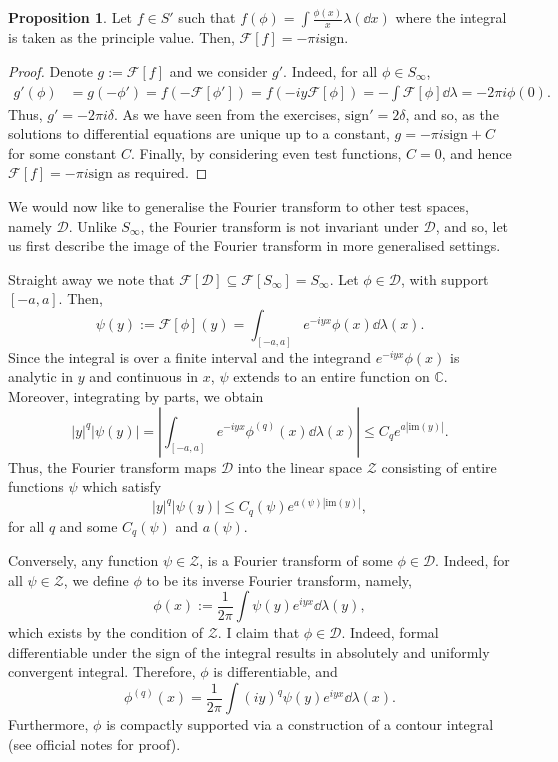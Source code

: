 \documentclass[]{article}
\theoremstyle{definition}
\theoremstyle{definition}
\newtheorem{proposition}{Proposition}[section]
\begin{document}
\begin{proposition}
  Let \(f \in S'\) such that \(f(\phi) = \int \frac{\phi(x)}{x} \lambda(\dd x)\) 
  where the integral is taken as the principle value. Then, 
  \(\mathcal{F}[f] = -\pi i\text{sign}\).
\end{proposition}
\begin{proof}
  Denote \(g := \mathcal{F}[f]\) and we consider \(g'\). Indeed, for all 
  \(\phi \in S_\infty\),
  \[\begin{split}
    g'(\phi) & = g(-\phi') = f(-\mathcal{F}[\phi']) = 
      f(-iy \mathcal{F}[\phi]) = -\int \mathcal{F}[\phi] \dd \lambda = 
      -2\pi i \phi(0). 
  \end{split}\]
  Thus, \(g' = - 2\pi i \delta\). As we have seen from the exercises, 
  \(\text{sign}' = 2\delta\), and so, as the solutions to differential equations 
  are unique up to a constant, \(g = -\pi i \text{sign} + C\) for some 
  constant \(C\). Finally, by considering even test functions, \(C = 0\), and 
  hence \(\mathcal{F}[f] = -\pi i\text{sign}\) as required.
\end{proof}

We would now like to generalise the Fourier transform to other test spaces, 
namely \(\mathcal{D}\). Unlike \(S_\infty\), the Fourier transform is not 
invariant under \(\mathcal{D}\), and so, let us first describe the image 
of the Fourier transform in more generalised settings.

Straight away we note that \(\mathcal{F}[\mathcal{D}] \subseteq 
\mathcal{F}[S_\infty] = S_\infty\). Let \(\phi \in \mathcal{D}\), 
with support \([-a, a]\). Then, 
\[\psi(y) := \mathcal{F}[\phi](y) = \int_{[-a, a]} e^{-iyx} \phi(x) \dd \lambda(x).\]
Since the integral is over a finite interval and the integrand 
\(e^{-iyx}\phi(x)\) is analytic in \(y\) and continuous in \(x\), \(\psi\)
extends to an entire function on \(\mathbb{C}\). Moreover, integrating by 
parts, we obtain 
\[|y|^q |\psi(y)| = \left|\int_{[-a, a]} e^{-iyx}\phi^{(q)}(x) \dd \lambda(x)\right|
  \le C_q e^{a|\text{im}(y)|}.\] 
Thus, the Fourier transform maps \(\mathcal{D}\) into the linear space \(\mathcal{Z}\) 
consisting of entire functions \(\psi\) which satisfy 
\[|y|^q |\psi(y)| \le C_q(\psi) e^{a(\psi)|\text{im}(y)|},\]
for all \(q\) and some \(C_q(\psi)\) and \(a(\psi)\).

Conversely, any function \(\psi \in \mathcal{Z}\), is a Fourier transform 
of some \(\phi \in \mathcal{D}\). Indeed, for all \(\psi \in \mathcal{Z}\), 
we define \(\phi\) to be its inverse Fourier transform, namely, 
\[\phi(x) := \frac{1}{2\pi} \int \psi(y) e^{iyx} \dd \lambda(y),\]
which exists by the condition of \(\mathcal{Z}\).
I claim that \(\phi \in \mathcal{D}\). Indeed, formal differentiable under the 
sign of the integral results in absolutely and uniformly convergent 
integral. Therefore, \(\phi\) is differentiable, and 
\[\phi^{(q)}(x) = \frac{1}{2\pi} \int (iy)^q \psi(y) e^{iyx} \dd \lambda(x).\]
Furthermore, \(\phi\) is compactly supported via a construction of a 
contour integral (see official notes for proof).
\end{document}
